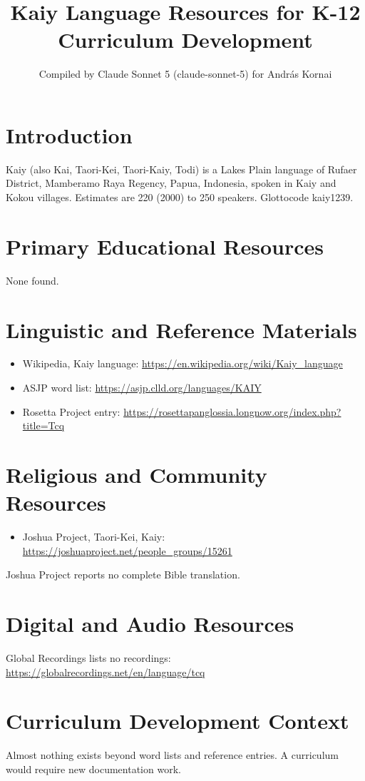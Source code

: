 \documentclass[12pt]{article}
\title{Kaiy Language Resources for K-12 Curriculum Development}
\author{Compiled by Claude Sonnet 5 (claude-sonnet-5) for Andr\'as Kornai}
\date{}
\begin{document}
\maketitle
\section{Introduction}
Kaiy (also Kai, Taori-Kei, Taori-Kaiy, Todi) is a Lakes Plain language of Rufaer District, Mamberamo Raya Regency, Papua, Indonesia, spoken in Kaiy and Kokou villages. Estimates are 220 (2000) to 250 speakers. Glottocode kaiy1239.
\section{Primary Educational Resources}
None found.
\section{Linguistic and Reference Materials}
\begin{itemize}
\item Wikipedia, Kaiy language: \url{https://en.wikipedia.org/wiki/Kaiy_language}
\item ASJP word list: \url{https://asjp.clld.org/languages/KAIY}
\item Rosetta Project entry: \url{https://rosettapanglossia.longnow.org/index.php?title=Tcq}
\end{itemize}
\section{Religious and Community Resources}
\begin{itemize}
\item Joshua Project, Taori-Kei, Kaiy: \url{https://joshuaproject.net/people_groups/15261}
\end{itemize}
Joshua Project reports no complete Bible translation.
\section{Digital and Audio Resources}
Global Recordings lists no recordings: \url{https://globalrecordings.net/en/language/tcq}
\section{Curriculum Development Context}
Almost nothing exists beyond word lists and reference entries. A curriculum would require new documentation work.
\end{document}
